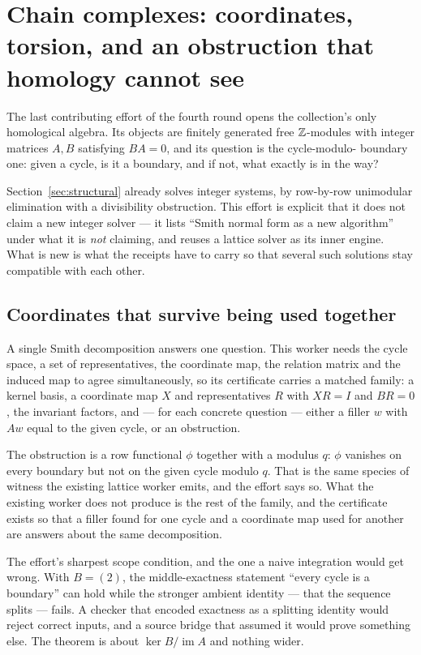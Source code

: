 \section{Chain complexes: coordinates, torsion, and an obstruction that homology cannot see}
\label{sec:homology}

The last contributing effort of the fourth round opens the collection's only
homological algebra. Its objects are finitely generated free $\mathbb{Z}$-modules with
integer matrices $A,B$ satisfying $BA=0$, and its question is the cycle-modulo-
boundary one: given a cycle, is it a boundary, and if not, what exactly is in
the way?

Section~\ref{sec:structural} already solves integer systems, by row-by-row
unimodular elimination with a divisibility obstruction. This effort is explicit
that it does not claim a new integer solver --- it lists ``Smith normal form as
a new algorithm'' under what it is \emph{not} claiming, and reuses a lattice
solver as its inner engine. What is new is what the receipts have to carry so
that several such solutions stay compatible with each other.

\subsection{Coordinates that survive being used together}

A single Smith decomposition answers one question. This worker needs the cycle
space, a set of representatives, the coordinate map, the relation matrix and
the induced map to agree simultaneously, so its certificate carries a matched
family: a kernel basis, a coordinate map $X$ and representatives $R$ with
$XR=I$ and $BR=0$, the invariant factors, and --- for each concrete question ---
either a filler $w$ with $Aw$ equal to the given cycle, or an obstruction.

The obstruction is a row functional $\phi$ together with a modulus $q$: $\phi$
vanishes on every boundary but not on the given cycle modulo $q$. That is the
same species of witness the existing lattice worker emits, and the effort says
so. What the existing worker does not produce is the rest of the family, and
the certificate exists so that a filler found for one cycle and a coordinate
map used for another are answers about the same decomposition.

\begin{remark}
The effort's sharpest scope condition, and the one a naive integration would
get wrong. With $B=(2)$, the middle-exactness statement ``every cycle is a
boundary'' can hold while the stronger ambient identity --- that the sequence
splits --- fails. A checker that encoded exactness as a splitting identity
would reject correct inputs, and a source bridge that assumed it would prove
something else. The theorem is about $\ker B/\operatorname{im}A$ and nothing
wider.
\end{remark}

